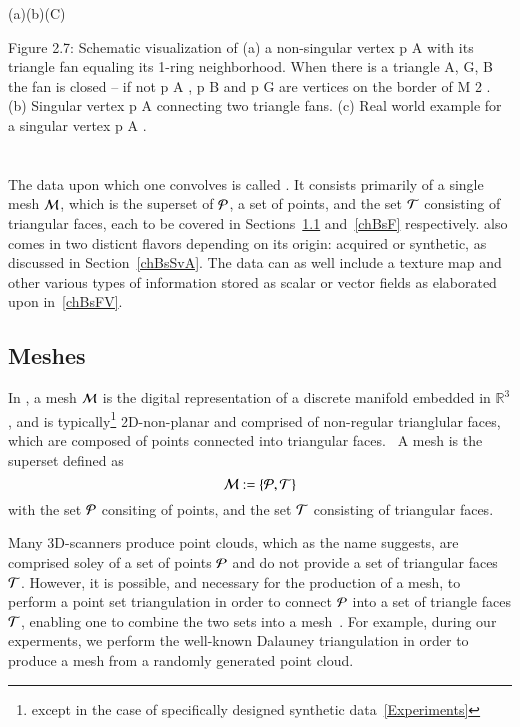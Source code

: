 (a)(b)(C)

Figure 2.7: Schematic visualization of (a) a non-singular vertex p A with its triangle fan equaling its 1-ring neighborhood. When there is a triangle {A, G, B} the fan is closed – if not p A , p B and p G are vertices on the border of M 2 . (b) Singular vertex p A connecting two triangle fans. (c) Real world example for a singular vertex p A .~\cite[p.~29]{Mara12}
%
%
%
%
%
\section{\tdd}
The data upon which one convolves  is called \tdd{}. It consists primarily of a single mesh $\mathcal{M}$, which is the superset of $\mathcal{P}$, a set of points, and the set $\mathcal{T}$ consisting of triangular faces, each to be covered in Sections~\ref{chBsP} and~\ref{chBsF} respectively. \tdd{} also comes in two disticnt flavors depending on its origin: acquired or synthetic, as discussed in Section~\ref{chBsSvA}. The data can as well include a texture map and other various types of information stored as scalar or vector fields as elaborated upon  in~\ref{chBsFV}.
%
\subsection{Meshes}
\label{chBsP}
In \tdd{}, a mesh $\mathcal{M}$ is the digital representation of a discrete manifold embedded in $\mathbb{R}^3$, and is typically\footnote{except in the case of specifically designed synthetic data~\ref{Experiments}} 2D-non-planar and comprised of non-regular trianglular faces, which are composed of points connected into triangular faces.~\cite[p.~25]{Mara12} A mesh is the superset defined as
\begin{equation}
	\mathcal{M} := \left \{\mathcal{P}, \mathcal{T}\right \}
	\label{eq:defineMesh}
\end{equation}%
%
with the set $\mathcal{P}$ consiting of points, and the set $\mathcal{T}$ consisting of triangular faces.

Many 3D-scanners produce point clouds\todoCitation{}, which as the name suggests, are comprised soley of a set of points $\mathcal{P}$ and do not provide a set of triangular faces $\mathcal{T}$. However, it is possible, and necessary for the production of a mesh, to perform a point set triangulation\todoCitation{} in order to connect $\mathcal{P}$ into a set of triangle faces $\mathcal{T}$, enabling one to combine the two sets into a mesh~\cite[p.~26]{Mara12}. For example, during our experments, we perform the well-known Dalauney triangulation\todoCitation{} in order to produce a mesh from a randomly generated point cloud.
%
